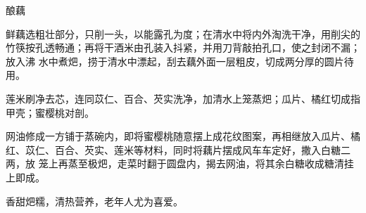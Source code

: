 %
%
%
%
%
%
%
\begin{recipe}[八宝酿藕]{酿藕}

\ingredients


\preparation

\step 鲜藕选粗壮部分，只削一头，以能露孔为度；在清水中将内外淘洗干净，用削尖的
竹筷按孔透畅通；再将干酒米由孔装入抖紧，并用刀背敲拍孔口，使之封闭不漏；放入沸
水中煮𤆵，捞于清水中漂起，刮去藕外面一层粗皮，切成两分厚的圆片待用。

\step 莲米刷净去芯，连同苡仁、百合、芡实洗净，加清水上笼蒸𤆵；瓜片、橘红切成指
甲壳；蜜樱桃对剖。

\step 网油修成一方铺于蒸碗内，即将蜜樱桃随意摆上成花纹图案，再相继放入瓜片、橘
红、苡仁、百合、芡实、莲米等材料，同时将藕片摆成风车车定好，撒入白糖二两，放
笼上再蒸至极𤆵，走菜时翻于圆盘内，揭去网油，将其余白糖收成糖清挂上即成。

\features

香甜𤆵糯，清热营养，老年人尤为喜爱。

\end{recipe}

